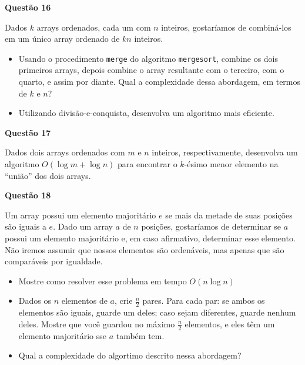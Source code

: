 \documentclass[]{article}
\begin{document}
\vspace{\baselineskip}

\textbf{Questão 16}

Dados $k$ arrays ordenados, cada um com $n$ inteiros, gostaríamos de combiná-los em um único array ordenado de $kn$ inteiros.
\begin{itemize}
  \item
    Usando o procedimento \texttt{merge} do algoritmo \texttt{mergesort}, combine os dois primeiros arrays, depois combine o array resultante com o terceiro, com o quarto, e assim por diante.
    Qual a complexidade dessa abordagem, em termos de $k$ e $n$?
  \item
    Utilizando divisão-e-conquista, desenvolva um algoritmo mais eficiente.
\end{itemize}

\vspace{\baselineskip}

\textbf{Questão 17}

Dados dois arrays ordenados com $m$ e $n$ inteiros, respectivamente, desenvolva um algoritmo $O(\log m + \log n)$ para encontrar o $k$-ésimo menor elemento na ``união'' dos dois arrays.

\vspace{\baselineskip}

\textbf{Questão 18}

Um array possui um elemento majoritário $e$ se mais da metade de suas posições são iguais a $e$.
Dado um array $a$ de $n$ posições, gostaríamos de determinar se $a$ possui um elemento majoritário e, em caso afirmativo, determinar esse elemento.
Não iremos assumir que nossos elementos são ordenáveis, mas apenas que são comparáveis por igualdade.
\begin{itemize}
  \item
    Mostre como resolver esse problema em tempo $O(n \log n)$
  \item
    Dados os $n$ elementos de $a$, crie $\frac{n}{2}$ pares.
    Para cada par: se ambos os elementos são iguais, guarde um deles; caso sejam diferentes, guarde nenhum deles.
    Mostre que você guardou no máximo $\frac{n}{2}$ elementos, e eles têm um elemento majoritário sse $a$ também tem.
  \item
    Qual a complexidade do algortimo descrito nessa abordagem?
\end{itemize}
\end{document}
